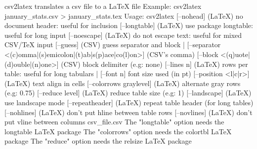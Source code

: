 csv2latex translates a csv file to a LaTeX file
Example: csv2latex january_stats.csv > january_stats.tex
Usage: csv2latex [--nohead] (LaTeX) no document header: useful for inclusion
	[--longtable] (LaTeX) use package longtable: useful for long input
	[--noescape] (LaTeX) do not escape text: useful for mixed CSV/TeX input
	[--guess] (CSV) guess separator and block |
	[--separator <(c)omma|(s)emicolon|(t)ab|s(p)ace|co(l)on>] (CSV's comma)
	[--block <(q)uote|(d)ouble|(n)one>] (CSV) block delimiter (e.g: none)
	[--lines n] (LaTeX) rows per table: useful for long tabulars |
		[--font n] font size used (in pt)
	[--position <l|c|r>] (LaTeX) text align in cells
	[--colorrows graylevel] (LaTeX) alternate gray rows (e.g: 0.75)
	[--reduce level] (LaTeX) reduce table size (e.g: 1)
	[--landscape] (LaTeX) use landscape mode
	[--repeatheader] (LaTeX) repeat table header (for long tables)
	[--nohlines] (LaTeX) don't put hline between table rows
	[--novlines] (LaTeX) don't put vline between columns
		csv_file.csv
The "longtable" option needs the {longtable} LaTeX package
The "colorrows" option needs the {colortbl} LaTeX package
The "reduce" option needs the {relsize} LaTeX package
